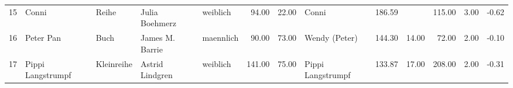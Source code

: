 \begin{sidewaystable}[ht]
\begin{center}
{\begin{tabular}{rllllrrlrrrrr}
  15 & Conni                                                                                                                                                                                                                                                           & Reihe & Julia Boehmerz                                                                                                                                                                                                                                                  & weiblich & 94.00 & 22.00 & Conni                                                                                                                                                                                                                                                           & 186.59 &  & 115.00 & 3.00 & -0.62 \\ 
  16 & Peter Pan                                                                                                                                                                                                                                                       & Buch & James M. Barrie                                                                                                                                                                                                                                                 & maennlich & 90.00 & 73.00 & Wendy (Peter)                                                                                                                                                                                                                                                   & 144.30 & 14.00 & 72.00 & 2.00 & -0.10 \\ 
  17 & Pippi Langstrumpf                                                                                                                                                                                                                                               & Kleinreihe & Astrid Lindgren                                                                                                                                                                                                                                                 & weiblich & 141.00 & 75.00 & Pippi Langstrumpf                                                                                                                                                                                                                                               & 133.87 & 17.00 & 208.00 & 2.00 & -0.31 \\ 

\end{tabular}}
\end{center}
\end{sidewaystable}
